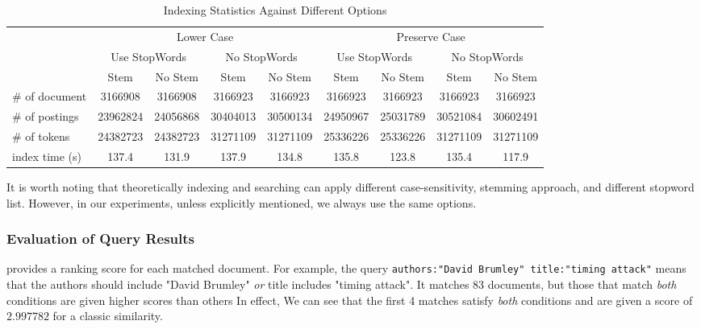 \begin{table*}[t]
\centering
\caption{Indexing Statistics Against Different Options}\label{tbl:indexOptions}
\begin{tabular}{|l|c|c|c|c|c|c|c|c|}
\hline
\multirow{3}{*}{} & \multicolumn{4}{c|}{Lower Case}                                        & \multicolumn{4}{c|}{Preserve Case}                                     \\ \cline{2-9}
                  & \multicolumn{2}{c|}{Use StopWords} & \multicolumn{2}{c|}{No StopWords} & \multicolumn{2}{c|}{Use StopWords} & \multicolumn{2}{c|}{No StopWords} \\ \cline{2-9}
                  & Stem             & No Stem         & Stem            & No Stem         & Stem             & No Stem         & Stem            & No Stem         \\ \hline
\# of document         & 3166908          & 3166908         & 3166923         & 3166923         & 3166923          & 3166923         & 3166923         & 3166923         \\ \hline
\# of postings     & 23962824         & 24056868        & 30404013        & 30500134        & 24950967         & 25031789        & 30521084        & 30602491        \\ \hline
\# of tokens      & 24382723         & 24382723        & 31271109        & 31271109        & 25336226         & 25336226        & 31271109        & 31271109        \\ \hline
index time (s)          & 137.4            & 131.9           & 137.9           & 134.8           & 135.8            & 123.8           & 135.4           & 117.9           \\ \hline
\end{tabular}
\end{table*}

It is worth noting that theoretically indexing and searching can apply different case-sensitivity, stemming approach, and different stopword list. However, in our experiments, unless explicitly mentioned, we always use the same options.

\subsubsection{Evaluation of Query Results}

{\SS} provides a ranking score for each matched document. For example, the query \verb|authors:"David Brumley" title:"timing attack"| means that the authors should include "David Brumley" \textit{or} title includes "timing attack". It matches 83 documents, but those that match \textit{both} conditions are given higher scores than others In effect, We can see that the first 4 matches satisfy \textit{both} conditions and are given a score of $2.997782$ for a classic similarity.

